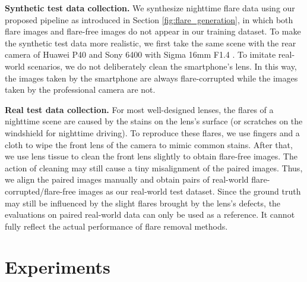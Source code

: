 \documentclass{article}
\newcommand{\yuekun}[1]{{\color{black}{#1}}}
\begin{document}
\noindent
\textbf{Synthetic test data collection.} 
We synthesize nighttime flare data using our proposed pipeline as introduced in Section \ref{fig:flare_generation}, in which both flare images and flare-free images do not appear in our training dataset. 
To make the synthetic test data more realistic, we first take the same scene with the rear camera of Huawei P40 \yuekun{(smartphone camera)} and Sony  6400 with Sigma 16mm F1.4 \yuekun{(professional camera)}. 
To imitate real-world scenarios, we do not deliberately clean the smartphone's lens. 
In this way, the images taken by the smartphone are always flare-corrupted while the images taken by the professional camera are not.
\yuekun{Referring to these flare-corrupted images, we synthesize flare images and add them to the images captured by the professional camera to compose flare-free/flare-corrupted pairs.
At last, we synthesize 100 pairs of data for the test.} 

\noindent
\textbf{Real test data collection.} 
For most well-designed lenses, the flares of a nighttime scene are caused by the stains on the lens's surface (or scratches on the windshield for nighttime driving). 
To reproduce these flares, we use fingers and a cloth to wipe the front lens of the camera to mimic common stains. 
After that, we use lens tissue to clean the front lens slightly to obtain flare-free images.
The action of cleaning may still cause a tiny misalignment of the paired images. 
Thus, we align the paired images manually and obtain \yuekun{100} pairs of real-world flare-corrupted/flare-free images as our real-world test dataset. 
Since the ground truth may still be influenced by the slight flares brought by the lens's defects, the evaluations on paired real-world data can only be used as a reference. 
It cannot fully reflect the actual performance of flare removal methods. 

\vspace{-3mm}
\section{Experiments}
\label{experiments}
\vspace{-2mm}
\yuekun{
To demonstrate the effectiveness and advantages of our dataset, we compare the performance of different datasets and methods for nighttime flare removal.
We also present a benchmark of the existing image restoration methods on our dataset.
}
\end{document}
